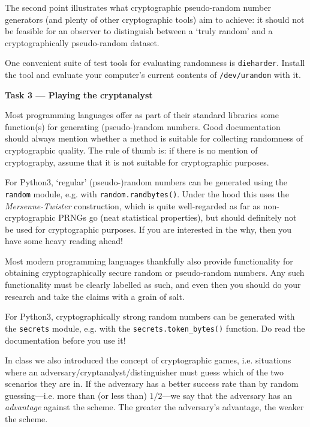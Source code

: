 \documentclass{practice}
\begin{document}
The second point illustrates what cryptographic pseudo-random number generators (and plenty of other cryptographic tools) aim to achieve: it should not be feasible for an observer to distinguish between a `truly random' and a cryptographically pseudo-random dataset.

One convenient suite of test tools for evaluating randomness is \texttt{dieharder}\footnotemark{}.
Install the tool and evaluate your computer's current contents of \texttt{/dev/urandom} with it.

\textbf{Task 3 --- Playing the cryptanalyst}

Most programming languages offer as part of their standard libraries some function(s) for generating (pseudo-)random numbers.
Good documentation should always mention whether a method is suitable for collecting randomness of cryptographic quality.
The rule of thumb is: if there is no mention of cryptography, assume that it is not suitable for cryptographic purposes.

For Python3, `regular' (pseudo-)random numbers can be generated using the \texttt{random}\footnotemark{} module, e.g. with \texttt{random.randbytes()}.%
Under the hood this uses the \emph{Mersenne-Twister} construction\footnotemark{}, which is quite well-regarded as far as non-cryptographic PRNGs go (neat statistical properties), but should definitely not be used for cryptographic purposes.
If you are interested in the why, then you have some heavy reading ahead!

Most modern programming languages thankfully also provide functionality for obtaining cryptographically secure random or pseudo-random numbers.
Any such functionality must be clearly labelled as such, and even then you should do your research and take the claims with a grain of salt.

For Python3, cryptographically strong random numbers can be generated with the \texttt{secrets}\footnotemark{} module, e.g. with the \texttt{secrets.token\_bytes()} function.%
Do read the documentation before you use it!

In class we also introduced the concept of cryptographic games, i.e. situations where an adversary/cryptanalyst/distinguisher must guess which of the two scenarios they are in.
If the adversary has a better success rate than by random guessing---i.e. more than (or less than) $1/2$---we say that the adversary has an \emph{advantage} against the scheme.
The greater the adversary's advantage, the weaker the scheme.
\end{document}
